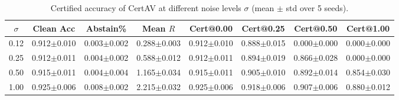 \begin{table}[t]
\centering
\caption{Certified accuracy of CertAV at different noise levels $\sigma$ (mean $\pm$ std over 5 seeds).}
\label{tab:main_cert}
\begin{tabular}{c|ccc|cccc}
\toprule
$\sigma$ & Clean Acc & Abstain\% & Mean $R$ & Cert@0.00 & Cert@0.25 & Cert@0.50 & Cert@1.00 \\
\midrule
0.12 & 0.912\tiny{$\pm$0.010} & 0.003\tiny{$\pm$0.002} & 0.288\tiny{$\pm$0.003} & 0.912\tiny{$\pm$0.010} & 0.888\tiny{$\pm$0.015} & 0.000\tiny{$\pm$0.000} & 0.000\tiny{$\pm$0.000} \\
0.25 & 0.912\tiny{$\pm$0.011} & 0.004\tiny{$\pm$0.002} & 0.588\tiny{$\pm$0.012} & 0.912\tiny{$\pm$0.011} & 0.894\tiny{$\pm$0.019} & 0.866\tiny{$\pm$0.028} & 0.000\tiny{$\pm$0.000} \\
0.50 & 0.915\tiny{$\pm$0.011} & 0.004\tiny{$\pm$0.004} & 1.165\tiny{$\pm$0.034} & 0.915\tiny{$\pm$0.011} & 0.905\tiny{$\pm$0.010} & 0.892\tiny{$\pm$0.014} & 0.854\tiny{$\pm$0.030} \\
1.00 & 0.925\tiny{$\pm$0.006} & 0.008\tiny{$\pm$0.002} & 2.215\tiny{$\pm$0.032} & 0.925\tiny{$\pm$0.006} & 0.918\tiny{$\pm$0.006} & 0.907\tiny{$\pm$0.006} & 0.880\tiny{$\pm$0.012} \\
\bottomrule
\end{tabular}
\end{table}